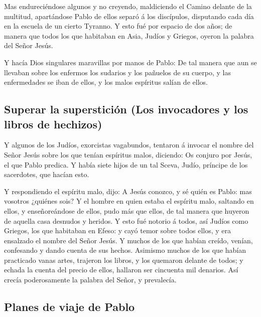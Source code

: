  Mas endureciéndose algunos y no creyendo, maldiciendo el
Camino delante de la multitud, apartándose Pablo de ellos separó á los
discípulos, disputando cada día en la escuela de un cierto Tyranno.
 Y esto fué por espacio de dos años; de manera que todos
los que habitaban en Asia, Judíos y Griegos, oyeron la palabra del Señor
Jesús.

 Y hacía Dios singulares maravillas por manos de Pablo:
 De tal manera que aun se llevaban sobre los enfermos los
sudarios y los pañuelos de su cuerpo, y las enfermedades se iban de
ellos, y los malos espíritus salían de ellos.

\hypertarget{superar-la-supersticiuxf3n-los-invocadores-y-los-libros-de-hechizos}{%
\subsection{Superar la superstición (Los invocadores y los libros de
hechizos)}\label{superar-la-supersticiuxf3n-los-invocadores-y-los-libros-de-hechizos}}

 Y algunos de los Judíos, exorcistas vagabundos, tentaron
á invocar el nombre del Señor Jesús sobre los que tenían espíritus
malos, diciendo: Os conjuro por Jesús, el que Pablo predica.
 Y había siete hijos de un tal Sceva, Judío, príncipe de
los sacerdotes, que hacían esto.

 Y respondiendo el espíritu malo, dijo: A Jesús conozco,
y sé quién es Pablo: mas vosotros ¿quiénes sois?  Y el
hombre en quien estaba el espíritu malo, saltando en ellos, y
enseñoreándose de ellos, pudo más que ellos, de tal manera que huyeron
de aquella casa desnudos y heridos.  Y esto fué notorio á
todos, así Judíos como Griegos, los que habitaban en Efeso: y cayó temor
sobre todos ellos, y era ensalzado el nombre del Señor Jesús.
 Y muchos de los que habían creído, venían, confesando y
dando cuenta de sus hechos.  Asimismo muchos de los que
habían practicado vanas artes, trajeron los libros, y los quemaron
delante de todos; y echada la cuenta del precio de ellos, hallaron ser
cincuenta mil denarios.  Así crecía poderosamente la
palabra del Señor, y prevalecía.

\hypertarget{planes-de-viaje-de-pablo}{%
\subsection{Planes de viaje de Pablo}\label{planes-de-viaje-de-pablo}}

